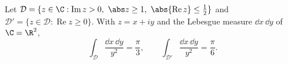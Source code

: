 Let $\mathcal D=\{z\in\C:\operatorname{Im}z>0,\ \abs z\ge1,\ \abs{\operatorname{Re}z}\le\tfrac12\}$ and
$\mathcal D'=\{z\in\mathcal D:\operatorname{Re}z\ge0\}$. With $z=x+iy$ and the Lebesgue measure $\dd x\,\dd y$ of $\C=\R^2$,
\[
  \int_{\mathcal D}\frac{\dd x\,\dd y}{y^2}=\frac\pi3,\qquad\int_{\mathcal D'}\frac{\dd x\,\dd y}{y^2}=\frac\pi6.
\]
